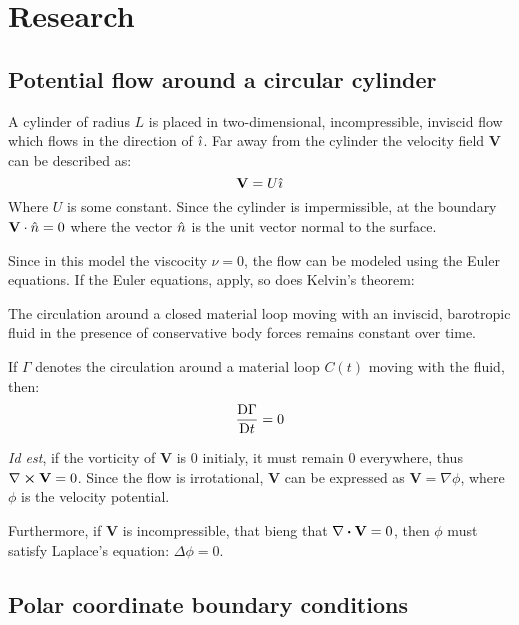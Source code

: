 \newpage
\section{Research}
\subsection{Potential flow around a circular cylinder}
A cylinder of radius $L$ is placed in two-dimensional, incompressible, inviscid flow which flows in the direction of $\hat{\imath}$.
Far away from the cylinder the velocity field $\mathbf{V}$ can be described as: 
\begin{equation}\label{equation:in-infinitum}
	\mathbf{V}=U\hat{\imath}
\end{equation}
Where $U$ is some constant. Since the cylinder is impermissible, at the boundary $\mathbf{V}\cdot\hat{n}=0$ where the vector $\hat{n}$ is the unit vector normal to the surface. 

Since in this model the viscocity $\nu=0$, the flow can be modeled using the Euler equations. If the Euler equations, apply, so does Kelvin's theorem:
\begin{theorem}
	The circulation around a closed material loop moving with an inviscid, barotropic fluid in the presence of conservative body forces remains constant over time.\needcitation
	
	If $\Gamma$ denotes the circulation around a material loop $C(t)$ moving with the fluid, then:
	$$\frac{\mathrm{D} \Gamma}{\mathrm{D} t}=0$$
\end{theorem}

\textit{Id est}, if the vorticity of $\mathbf{V}$ is $0$ initialy, it must remain $0$ everywhere, thus $\curl\mathbf{V}=0$. Since the flow is irrotational, $\mathbf{V}$ can be expressed as $\mathbf{V}=\nabla\phi$, where $\phi$ is the velocity potential.

Furthermore, if $\mathbf{V}$ is incompressible, that bieng that $\divergence\mathbf{V}=0$, then $\phi$ must satisfy Laplace's equation: $\Delta\phi=0$.

\subsection{Polar coordinate boundary conditions}
